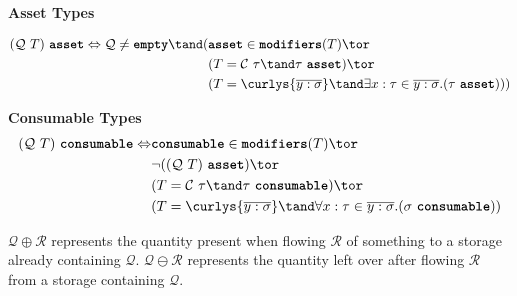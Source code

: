 \documentclass[10pt]{article}
\begin{document}
\framebox{$\tau~\asset$} \textbf{Asset Types}

\begin{align*}
    (\mathcal{Q}~T)~\asset \iff \mathcal{Q} \neq \emptyq \tand (& \asset \in \modifiers(T) \tor \\
                                                                & (T = \mathcal{C}~\tau \tand \tau~\asset) \tor \\
                                                                & (T = \curlys{\overline{y : \sigma}} \tand \exists x : \tau \in \overline{y : \sigma}. (\tau~\asset)))
\end{align*}

\framebox{$\tau~\consumable$} \textbf{Consumable Types}
\begin{align*}
    (\mathcal{Q}~T)~\consumable \iff &\consumable \in \modifiers(T) \tor \\
                                     &\lnot((\mathcal{Q}~T)~\asset) \tor \\
                                     &(T = \mathcal{C}~\tau \tand \tau~\consumable) \tor \\
                                     &(T = \curlys{\overline{y : \sigma}} \tand \forall x : \tau \in \overline{y : \sigma}. (\sigma~\consumable))
\end{align*}

$\mathcal{Q} \oplus \mathcal{R}$ represents the quantity present when flowing $\mathcal{R}$ of something to a storage already containing $\mathcal{Q}$.
$\mathcal{Q} \ominus \mathcal{R}$ represents the quantity left over after flowing $\mathcal{R}$ from a storage containing $\mathcal{Q}$.
\end{document}
